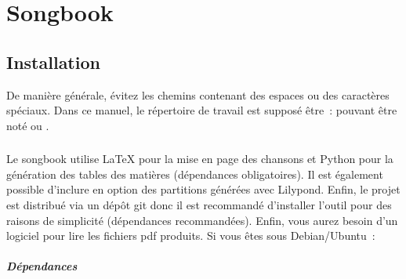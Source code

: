 \chapter{Songbook}
\setcounter{chapter}{1}
\label{chap:songbook}
\minitoc
{}
\newpage


\section{Installation}
\label{sb:install}

De manière générale, évitez les chemins contenant des espaces ou des
caractères spéciaux. Dans ce manuel, le répertoire de travail est
supposé être~:  pouvant être noté
 ou .

\subsection{\linux}

Le songbook utilise \LaTeX{} pour la mise en page des chansons et
Python pour la génération des tables des matières (dépendances
obligatoires). Il est également possible d'inclure en option des
partitions générées avec Lilypond. Enfin, le projet est distribué via
un dépôt git donc il est recommandé d'installer l'outil pour des
raisons de simplicité (dépendances recommandées). Enfin, vous aurez
besoin d'un logiciel pour lire les fichiers pdf produits. Si vous êtes
sous Debian/Ubuntu~:

\paragraph{Dépendances}

